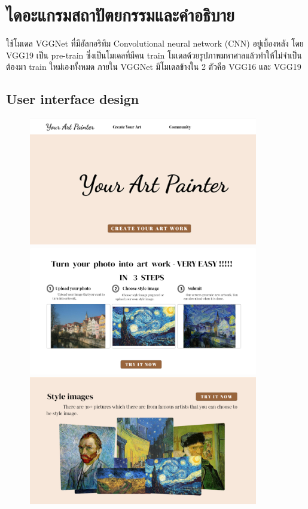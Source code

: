\documentclass[12pt,oneside,openright,a4paper]{cpe-thai-project}
\begin{document}
\newpage

\section{ไดอะแกรมสถาปัตยกรรมและคำอธิบาย}
\par\setlength{\parindent}{5ex}
ใช้โมเดล VGGNet ที่มีอัลกอริทึม Convolutional neural network (CNN) อยู่เบื้องหลัง โดย VGG19 เป็น pre-train ซึ่งเป็นโมเดลที่มีคน train โมเดลด้วยรูปภาพมหาศาลแล้วทำให้ไม่จำเป็นต้องมา train ใหม่เองทั้งหมด ภายใน VGGNet มีโมเดลข้างใน 2 ตัวคือ VGG16 และ VGG19

\subsection{User interface design}

\begin{figure}[!h]
  \centering
  \includegraphics[width=10cm]{./image/ui1.png}
  \includegraphics[width=10cm]{./image/ui1-2.png}
  \includegraphics[width=10cm]{./image/ui1-3.png}
  \label{fig:ui}
\end{figure}
\end{document}
